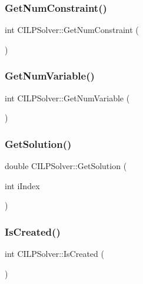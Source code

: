 \subsubsection{\texorpdfstring{GetNumConstraint()}{GetNumConstraint()}}
{\footnotesize\ttfamily int C\+I\+L\+P\+Solver\+::\+Get\+Num\+Constraint (\begin{DoxyParamCaption}{ }\end{DoxyParamCaption})}

\mbox{\label{classCILPSolver_a3a49add202ea4a77052dad9527c2d7cb}} 
\subsubsection{\texorpdfstring{GetNumVariable()}{GetNumVariable()}}
{\footnotesize\ttfamily int C\+I\+L\+P\+Solver\+::\+Get\+Num\+Variable (\begin{DoxyParamCaption}{ }\end{DoxyParamCaption})}

\mbox{\label{classCILPSolver_a29b0d08d626ff554d4d21911f3da0583}} 
\subsubsection{\texorpdfstring{GetSolution()}{GetSolution()}}
{\footnotesize\ttfamily double C\+I\+L\+P\+Solver\+::\+Get\+Solution (\begin{DoxyParamCaption}\item[{int}]{i\+Index }\end{DoxyParamCaption})}

\mbox{\label{classCILPSolver_ad6f7b432268e09326cb78d6a38656dc8}} 
\subsubsection{\texorpdfstring{IsCreated()}{IsCreated()}}
{\footnotesize\ttfamily int C\+I\+L\+P\+Solver\+::\+Is\+Created (\begin{DoxyParamCaption}{ }\end{DoxyParamCaption})}

